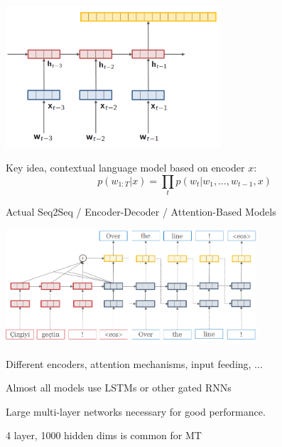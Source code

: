 \documentclass{beamer}
\let\tempone\itemize
\let\temptwo\enditemize
\renewenvironment{itemize}{\tempone\addtolength{\itemsep}{0.5\baselineskip}}{\temptwo}
\newcommand{\air}{\vspace{0.25cm}}
\newcommand{\cvec}{\mathbf{c}}
\begin{document}
\begin{frame}
  \begin{center}
  \end{center}
    \air 
   
    \begin{center}
      \includegraphics[width=0.6\textwidth]{rnnlm6}
    \end{center}
  \begin{itemize}
  \item Key idea, contextual language model based on encoder $x$: 
  \end{itemize}
  \[ p(w_{1:T} | x) = \prod_{t} p(w_t | w_1, \ldots, w_{t-1}, x) \] 
  
\end{frame}


\begin{frame}
  \begin{center}
    Actual Seq2Seq / Encoder-Decoder / Attention-Based Models
  \end{center}
    \begin{center}
      \includegraphics[width=0.7\textwidth]{simple-attn}
    \end{center}
  \begin{itemize}
  \item Different encoders, attention mechanisms, input feeding, ...
    \air
  \item Almost all models use LSTMs or other gated RNNs 
    \air
  \item Large multi-layer networks  necessary for good performance.
    \begin{itemize}
    \item 4 layer, 1000 hidden dims is common for MT
    \end{itemize}
  \end{itemize}
\end{frame}
\end{document}
